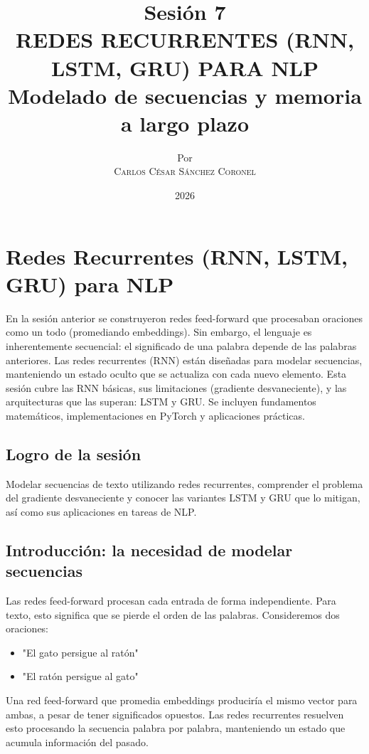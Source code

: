\documentclass[12pt,a4paper,openany,oneside]{book}
\title{
    \textbf{Sesión 7} \\ 
    \Huge \textbf{REDES RECURRENTES (RNN, LSTM, GRU) PARA NLP} \\
    \Large Modelado de secuencias y memoria a largo plazo
}
\author{
    \small Por \\ \vspace{0.2cm}
    \Large \textsc{Carlos César Sánchez Coronel}
}
\date{2026}
\begin{document}
\maketitle
\tableofcontents
{}

\chapter{Redes Recurrentes (RNN, LSTM, GRU) para NLP}

En la sesión anterior se construyeron redes feed-forward que procesaban oraciones como un todo (promediando embeddings). Sin embargo, el lenguaje es inherentemente secuencial: el significado de una palabra depende de las palabras anteriores. Las redes recurrentes (RNN) están diseñadas para modelar secuencias, manteniendo un estado oculto que se actualiza con cada nuevo elemento. Esta sesión cubre las RNN básicas, sus limitaciones (gradiente desvaneciente), y las arquitecturas que las superan: LSTM y GRU. Se incluyen fundamentos matemáticos, implementaciones en PyTorch y aplicaciones prácticas.

\section{Logro de la sesión}
Modelar secuencias de texto utilizando redes recurrentes, comprender el problema del gradiente desvaneciente y conocer las variantes LSTM y GRU que lo mitigan, así como sus aplicaciones en tareas de NLP.

\section{Introducción: la necesidad de modelar secuencias}
Las redes feed-forward procesan cada entrada de forma independiente. Para texto, esto significa que se pierde el orden de las palabras. Consideremos dos oraciones:
\begin{itemize}
    \item "El gato persigue al ratón"
    \item "El ratón persigue al gato"
\end{itemize}
Una red feed-forward que promedia embeddings produciría el mismo vector para ambas, a pesar de tener significados opuestos. Las redes recurrentes resuelven esto procesando la secuencia palabra por palabra, manteniendo un estado que acumula información del pasado.
\end{document}
